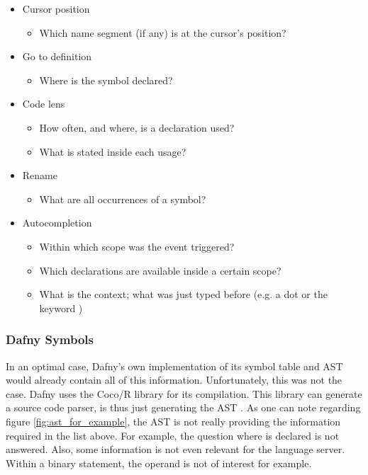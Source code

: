 

\begin{itemize}
    \item Cursor position
    \begin{itemize}
        \item Which name segment (if any) is at the cursor's position?
    \end{itemize}

    \item Go to definition
        \begin{itemize}
            \item Where is the symbol declared?
        \end{itemize}

    \item Code lens
        \begin{itemize}
            \item How often, and where, is a declaration used?
            \item What is stated inside each usage?
        \end{itemize}

    \item Rename
        \begin{itemize}
            \item What are all occurrences of a symbol?
        \end{itemize}

    \item Autocompletion
        \begin{itemize}
            \item Within which scope was the event triggered?
            \item Which declarations are available inside a certain scope?
            \item What is the context; what was just typed before (e.g. a dot or the keyword )
        \end{itemize}
\end{itemize}

\subsubsection{Dafny Symbols}
In an optimal case, Dafny's own implementation of its symbol table and AST would already contain all of this information.
Unfortunately, this was not the case.
Dafny uses the Coco/R library for its compilation.
This library can generate a source code parser, is thus just generating the AST \cite{coco}.
As one can note regarding figure \ref{fig:ast_for_example}, the AST is not really providing the information required in the list above.
For example, the question where  is declared is not answered.
Also, some information is not even relevant for the language server.
Within a binary statement, the operand is not of interest for example.\\

